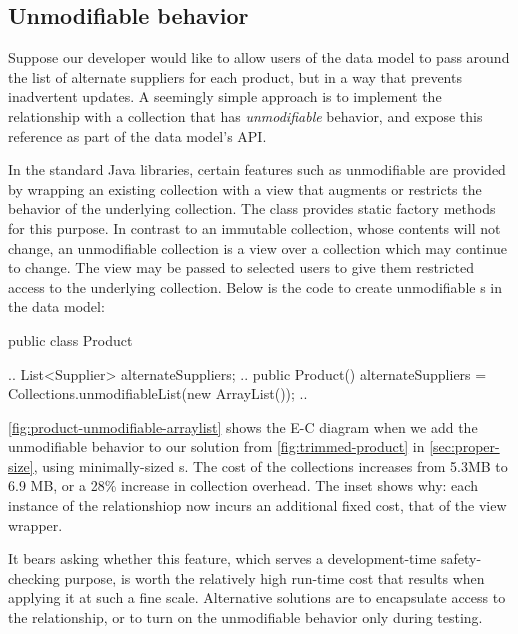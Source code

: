 \subsection{Unmodifiable behavior}
\label{sec:unmodifiable-collections}
Suppose our developer would like to allow users of the
data model to pass around the list of alternate suppliers for each product, 
but in a way that prevents inadvertent updates. A seemingly simple approach is
to implement the relationship with a collection that has \emph{unmodifiable}
behavior, and expose this reference as part of the data model's API. 

In the standard Java libraries, certain features such as
unmodifiable are provided by wrapping an existing collection with a
view that augments or restricts the behavior of the
underlying collection. The  class provides static factory
methods for this purpose. In contrast to an
immutable collection, whose contents will not change, an unmodifiable collection
is a view over a collection which may continue to change. 
The view may be passed to selected users to give them restricted access to the
underlying collection. Below is the code
to create unmodifiable s in the data model:
 
\begin{shortlisting}
public class Product {
	..
	List<Supplier> alternateSuppliers;
	..
	public Product() {
		alternateSuppliers = Collections.unmodifiableList(new ArrayList());
		..
	}
	
}
\end{shortlisting}


\autoref{fig:product-unmodifiable-arraylist}
shows the E-C diagram when we add the unmodifiable behavior to our solution
from \autoref{fig:trimmed-product} in \autoref{sec:proper-size}, using
minimally-sized s. The cost of the collections
increases from 5.3MB to 6.9 MB, or a 28\% increase in collection overhead.  The
inset shows why: each instance of the relationshiop now incurs an additional
fixed cost, that of the view wrapper.

It bears asking whether this feature, which serves a development-time
safety-checking purpose, is worth the relatively high run-time cost that results
when applying it at such a fine scale.  Alternative solutions are to encapsulate access to the
relationship, or to turn on the unmodifiable behavior only during testing.

